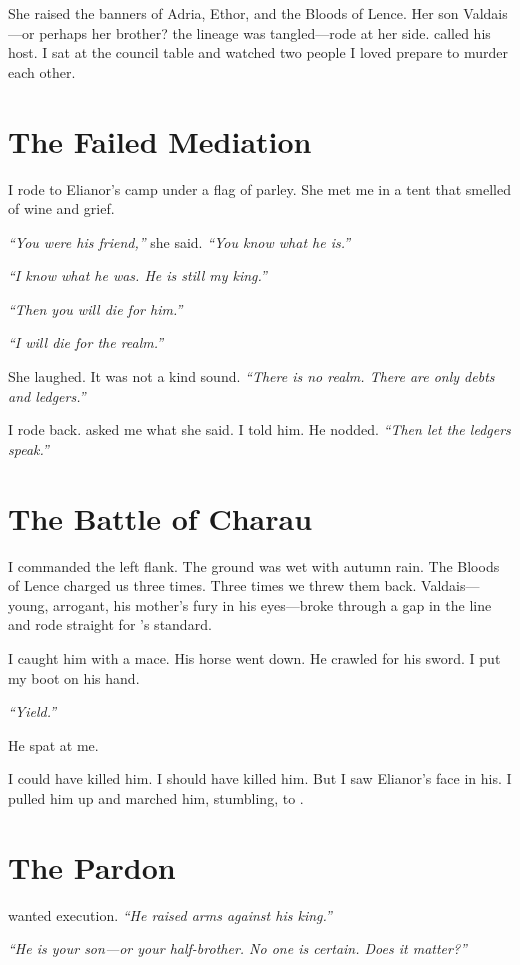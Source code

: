 \documentclass[11pt,a5paper]{book}
\begin{document}
She raised the banners of Adria, Ethor, and the Bloods of Lence. Her son Valdais---or perhaps her brother? the lineage was tangled---rode at her side. \baldvyn{} called his host. I sat at the council table and watched two people I loved prepare to murder each other.

\section*{The Failed Mediation}
I rode to Elianor's camp under a flag of parley. She met me in a tent that smelled of wine and grief.

\textit{``You were his friend,''} she said. \textit{``You know what he is.''}

\textit{``I know what he was. He is still my king.''}

\textit{``Then you will die for him.''}

\textit{``I will die for the realm.''}

She laughed. It was not a kind sound. \textit{``There is no realm. There are only debts and ledgers.''}

I rode back. \baldvyn{} asked me what she said. I told him. He nodded. \textit{``Then let the ledgers speak.''}

\section*{The Battle of Charau}
I commanded the left flank. The ground was wet with autumn rain. The Bloods of Lence charged us three times. Three times we threw them back. Valdais---young, arrogant, his mother's fury in his eyes---broke through a gap in the line and rode straight for \baldvyn's standard.

I caught him with a mace. His horse went down. He crawled for his sword. I put my boot on his hand.

\textit{``Yield.''}

He spat at me.

I could have killed him. I should have killed him. But I saw Elianor's face in his. I pulled him up and marched him, stumbling, to \baldvyn.

\section*{The Pardon}
\baldvyn{} wanted execution. \textit{``He raised arms against his king.''}

\textit{``He is your son---or your half-brother. No one is certain. Does it matter?''}
\end{document}
